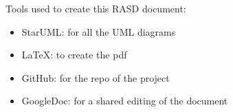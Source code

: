 \clearpage
{}
\label{sect:userInterface}


\clearpage
{}
\label{sect:requirements}


\clearpage
{}
\label{sect:implementation}


\clearpage
{}
\label{sect:effort}


\clearpage
{}
\color{Black}
Tools used to create this RASD document:\\
\begin {itemize}
	\item StarUML: for all the UML diagrams
	\item LaTeX: to create the pdf
	\item GitHub: for the repo of the project
	\item GoogleDoc: for a shared editing of the document
\end {itemize}






